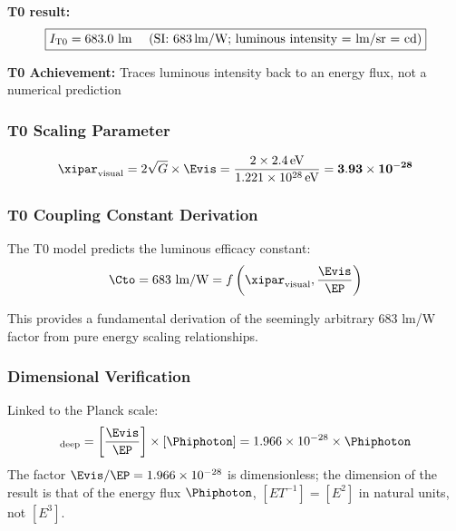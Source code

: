 	\textbf{T0 result:}
	\begin{equation}
		\boxed{I_{\text{T0}} = 683.0 \text{ lm \quad (SI: 683\,lm/W; luminous intensity = lm/sr = cd)}}
		\label{eq:candela_t0_result}
	\end{equation}
	
	\textbf{T0 Achievement:} Traces luminous intensity back to an energy flux, not a numerical prediction
	
	\subsubsection{T0 Scaling Parameter}
	\label{subsubsec:candela_scaling_parameter}
	
	\begin{equation}
		\xipar_{\text{visual}} = 2\sqrt{G} \times \Evis = \frac{2 \times 2.4\,\text{eV}}{1.221 \times 10^{28}\,\text{eV}} = \mathbf{3.93 \times 10^{-28}}
		\label{eq:xi_visual_calculated}
	\end{equation}
	
	\subsubsection{T0 Coupling Constant Derivation}
	\label{subsubsec:t0_coupling_derivation}
	
	The T0 model predicts the luminous efficacy constant:
	\begin{equation}
		\Cto = 683 \text{ lm/W} = f\left(\xipar_{\text{visual}}, \frac{\Evis}{\EP}\right)
		\label{eq:t0_coupling_prediction}
	\end{equation}
	
	This provides a fundamental derivation of the seemingly arbitrary 683 lm/W factor from pure energy scaling relationships.
	
	\subsubsection{Dimensional Verification}
	\label{subsubsec:candela_dimensional_verification}
	
	Linked to the Planck scale:
	\begin{equation}
		[I_{\text{T0}}]_{\text{deep}} = \left[\frac{\Evis}{\EP}\right] \times [\Phiphoton] = 1.966 \times 10^{-28} \times \Phiphoton
		\label{eq:candela_e3_dimension}
	\end{equation}
	The factor $\Evis/\EP = 1.966\times10^{-28}$ is dimensionless; the dimension of the result is that of the energy flux $\Phiphoton$, $[E T^{-1}] = [E^2]$ in natural units, not $[E^3]$.
	
